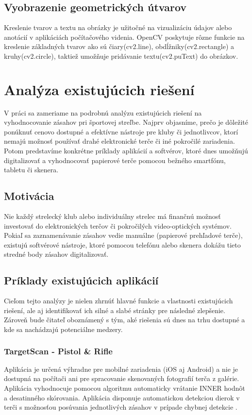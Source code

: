\subsection{Vyobrazenie geometrických útvarov}
Kreslenie tvarov a textu na obrázky je užitočné na vizualizáciu údajov alebo anotácií v aplikáciách počítačového 
videnia. OpenCV poskytuje rôzne funkcie na kreslenie základných tvarov ako sú čiary(cv2.line), obdĺžniky(cv2.rectangle) 
a kruhy(cv2.circle), taktiež umožňuje pridávanie textu(cv2.puText) do obrázkov.


\section{Analýza existujúcich riešení}
V práci sa zameriame na podrobnú analýzu existujúcich riešení na vyhodnocovanie zásahov pri športovej streľbe. 
Najprv objasníme, prečo je dôležité ponúknuť cenovo dostupné a efektívne nástroje pre kluby či jednotlivcov, ktorí 
nemajú možnosť používať drahé elektronické terče či iné pokročilé zariadenia. Potom predstavíme konkrétne 
príklady aplikácií a softvérov, ktoré dnes umožňujú digitalizovať a vyhodnocovať papierové terče pomocou bežného 
smartfónu, tabletu či skenera.

\subsection{Motivácia}
Nie každý strelecký klub alebo individuálny strelec má finančnú možnosť investovať do elektronických terčov či 
pokročilých video-optických systémov. Pokiaľ sa zaznamenávanie zásahov vedie manuálne (papierové prehľadové terče), 
existujú softvérové nástroje, ktoré pomocou telefónu alebo skenera dokážu tieto 
stredné body zásahov digitalizovať.

\subsection{Príklady existujúcich aplikácií}
Cieľom tejto analýzy je nielen zhrnúť hlavné funkcie a vlastnosti existujúcich riešení, 
ale aj identifikovať ich silné a slabé stránky pre následné zlepšenie. Zároveň bude čitateľ oboznámený s tým, aké 
riešenia sú dnes na trhu dostupné a kde sa nachádzajú potenciálne medzery.

\subsubsection{TargetScan - Pistol \& Rifle}
Aplikácia je určená výhradne pre mobilné zariadenia (iOS aj Android) a nie je dostupná na počítači ani pre spracovanie skenovaných 
fotografií terča z galérie. Aplikácia vyhodnocuje pomocou algoritmu automaticky vrátanie INNER hodnôt a desatinného skórovania. Aplikácia
disponuje automatickou detekciou dierok v terči s možnosťou posúvania jednotlivých zásahov v prípade chybnej detekcie \cite{TargetScanApp}.

